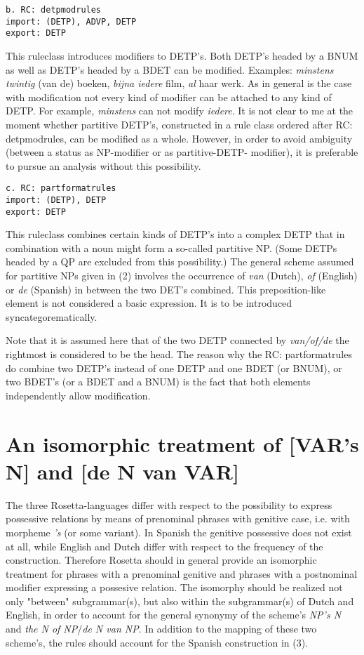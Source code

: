 \begin{verbatim}
b. RC: detpmodrules 
import: (DETP), ADVP, DETP
export: DETP
\end{verbatim}

This ruleclass introduces modifiers to DETP's. Both DETP's headed by a BNUM as
well as DETP's headed by a BDET can be modified. Examples: {\em minstens
twintig} (van de) boeken, {\em bijna iedere} film, {\em al} haar werk. As in
general is the case with modification not every kind of modifier can be
attached to any kind of DETP. For example, {\em minstens} can not modify {\em
iedere}. It is not clear to me at the moment whether partitive DETP's,
constructed in a rule class ordered after RC: detpmodrules, can be modified as
a whole. However, in order to avoid ambiguity (between a status as NP-modifier
or as partitive-DETP- modifier), it is preferable to pursue an analysis
without this possibility. 

\begin{verbatim}
c. RC: partformatrules 
import: (DETP), DETP
export: DETP
\end{verbatim}

This ruleclass combines certain kinds of DETP's into a complex DETP that in
combination with a noun might form a so-called partitive NP. (Some DETPs headed
by a QP are excluded from this possibility.) The general scheme assumed for
partitive NPs given in (2) involves the occurrence of {\em van} (Dutch), {\em
of} (English) or {\em de} (Spanish) in between the two DET's combined. This
preposition-like element is not considered a basic expression. It is to be
introduced syncategorematically. 

Note that it is assumed here that of the two DETP connected by {\em van/of/de}
the rightmost is considered to be the head. The reason why the RC:
partformatrules do combine two DETP's instead of one DETP and one BDET (or
BNUM), or two BDET's (or a BDET and a BNUM) is the fact that both elements 
independently allow modification. 

\section{An isomorphic treatment of [VAR's N] and [de N van VAR]}

The three Rosetta-languages differ with respect to the possibility to express
possessive relations by means of prenominal phrases with genitive case, i.e.
with morpheme {\em 's} (or some variant). In Spanish the genitive possessive
does not exist at all, while English and Dutch differ with respect to the
frequency of the construction. Therefore Rosetta should in general provide an
isomorphic treatment for phrases with a prenominal genitive and phrases with a
postnominal modifier expressing a possesive relation. The isomorphy should be
realized not only "between" subgrammar(s), but also within the subgrammar(s) of
Dutch and English, in order to account for the general synonymy of the scheme's
{\em NP's N} and {\em the N of NP}/{\em de N van NP}. In addition to the
mapping of these two scheme's, the rules should account for the Spanish
construction in (3).

